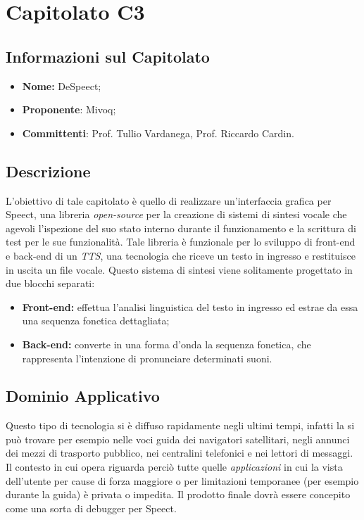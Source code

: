 \section{Capitolato C3}
\subsection{Informazioni sul Capitolato}
	\begin{itemize}
		\item \textbf{Nome:}
		DeSpeect;
		\item \textbf{Proponente}:
		Mivoq;
		\item \textbf{Committenti}:
		Prof. Tullio Vardanega, Prof. Riccardo Cardin.
	\end{itemize}

\subsection{Descrizione}
	L'obiettivo di tale capitolato è quello di realizzare un'interfaccia grafica per Speect, una libreria \textit{open-source} per la creazione di sistemi di sintesi vocale che agevoli l’ispezione del suo stato interno durante il funzionamento e la scrittura di test per le sue funzionalità.
	\newline \newline Tale libreria è funzionale per lo sviluppo di front-end e back-end di un \textit{TTS}, una tecnologia che riceve un testo in ingresso e restituisce in uscita un file vocale. Questo sistema di sintesi viene solitamente progettato in due blocchi separati:
	\begin{itemize}
		\item \textbf{Front-end:}
		effettua l'analisi linguistica del testo in ingresso ed estrae da essa una sequenza fonetica dettagliata;
		\item \textbf{Back-end:}
		converte in una forma d'onda la sequenza fonetica, che rappresenta l'intenzione di pronunciare determinati suoni.
	\end{itemize}

\subsection{Dominio Applicativo}
	 Questo tipo di tecnologia si è diffuso rapidamente negli ultimi tempi, infatti la si può trovare per esempio nelle voci guida dei navigatori satellitari, negli annunci dei mezzi di trasporto pubblico, nei centralini telefonici e nei lettori di messaggi.
	 \newline \newline Il contesto in cui opera riguarda perciò tutte quelle \textit{applicazioni} in cui la vista dell'utente per cause di forza maggiore o per limitazioni temporanee (per esempio durante la guida) è privata o impedita.
	 \newline \newline Il prodotto finale dovrà essere concepito come una sorta di debugger per Speect.

